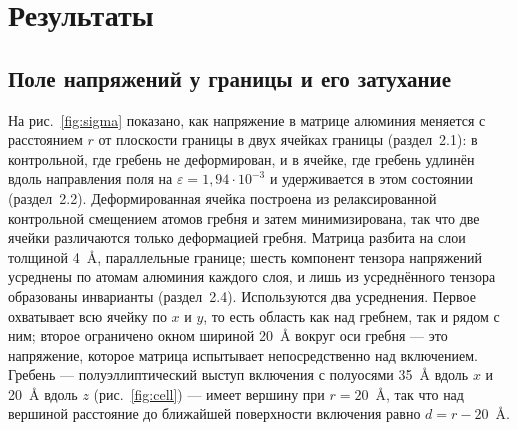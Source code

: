 \section{Результаты}

\subsection{Поле напряжений у границы и его затухание}

На рис.~\ref{fig:sigma} показано, как напряжение в матрице алюминия меняется
с расстоянием $r$ от плоскости границы в двух ячейках границы
(раздел~2.1): в контрольной, где гребень не деформирован, и в ячейке, где
гребень удлинён вдоль направления поля на $\varepsilon = 1{,}94\cdot10^{-3}$
и удерживается в этом состоянии (раздел~2.2). Деформированная ячейка
построена из релаксированной контрольной смещением атомов гребня и затем
минимизирована, так что две ячейки различаются только деформацией гребня.
Матрица разбита на слои толщиной 4~\AA{}, параллельные границе; шесть
компонент тензора напряжений усреднены по атомам алюминия каждого слоя, и
лишь из усреднённого тензора образованы инварианты (раздел~2.4).
Используются два усреднения. Первое охватывает всю ячейку по $x$ и $y$, то
есть область как над гребнем, так и рядом с ним; второе ограничено окном
шириной 20~\AA{} вокруг оси гребня --- это напряжение, которое матрица
испытывает непосредственно над включением. Гребень --- полуэллиптический
выступ включения с полуосями 35~\AA{} вдоль $x$ и 20~\AA{} вдоль $z$
(рис.~\ref{fig:cell}) --- имеет вершину при $r = 20$~\AA{}, так что над
вершиной расстояние до ближайшей поверхности включения равно
$d = r - 20$~\AA{}.

